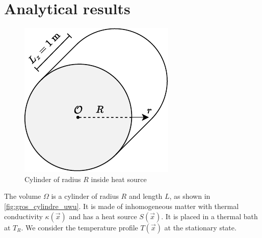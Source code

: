 \section{Analytical results}

\begin{figure}
    \vspace*{-1cm}
    \centering
    \includegraphics[width=\linewidth]{figures/cylindre.pdf}
    \caption{Cylinder of radius \(R\) inside heat source}
    \label{fig:gros_cylindre_uwu}
    \vspace*{1cm}
\end{figure}
The volume $\Omega$ is a cylinder of radius $R$ and length $L$, as shown in \autoref{fig:gros_cylindre_uwu}. It is made of inhomogeneous matter with thermal conductivity $\kappa(\vec{x})$ and has a heat source $S(\vec{x})$. It is placed in a thermal bath at $T_R$. We consider the temperature profile $T(\vec{x})$ at the stationary state.

